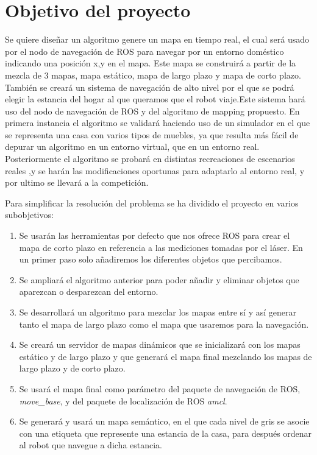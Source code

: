 \section{Objetivo del proyecto}
\label{sec:objetivos}

Se quiere diseñar un algoritmo genere un mapa en tiempo real, el cual será usado por el nodo de navegación de ROS para navegar por un entorno doméstico indicando una posición x,y en el mapa. Este mapa se construirá a partir de la mezcla de 3 mapas, mapa estático, mapa de largo plazo y mapa de corto plazo.
También se creará un sistema de navegación de alto nivel por el que se podrá elegir la estancia del hogar al que queramos que el robot viaje.Este sistema hará uso del nodo de navegación de ROS y del algoritmo de mapping propuesto.
En primera instancia el algoritmo se validará haciendo uso de un simulador en el que se representa una casa con varios tipos de muebles, ya que resulta más fácil de depurar un algoritmo en un entorno virtual, que en un entorno real. Posteriormente el algoritmo se probará en distintas recreaciones de escenarios reales ,y se harán las modificaciones oportunas para adaptarlo al entorno real, y por ultimo se llevará a la competición.

Para simplificar la resolución del problema se ha dividido el proyecto en varios subobjetivos:

\begin{enumerate}
\item Se usarán las herramientas por defecto que nos ofrece ROS para crear el mapa de corto plazo en referencia a las mediciones tomadas por el láser. En un primer paso solo añadiremos los diferentes objetos que percibamos.
\item Se ampliará el algoritmo anterior para poder añadir y eliminar objetos que aparezcan o desparezcan del entorno. 
\item Se desarrollará un algoritmo para mezclar los mapas entre sí y así generar tanto el mapa de largo plazo como el mapa que usaremos para la navegación.
\item Se creará un servidor de mapas dinámicos que se inicializará con los mapas estático y de largo plazo y que generará el mapa final mezclando los mapas de largo plazo y de corto plazo.
\item Se usará el mapa final como parámetro del paquete de navegación de ROS, \textit{move\_base}, y del paquete de localización de ROS \textit{amcl}.
\item Se generará y usará un mapa semántico, en el que cada nivel de gris se asocie con una etiqueta que represente una estancia de la casa, para después ordenar al robot que navegue a dicha estancia.
\end{enumerate}

